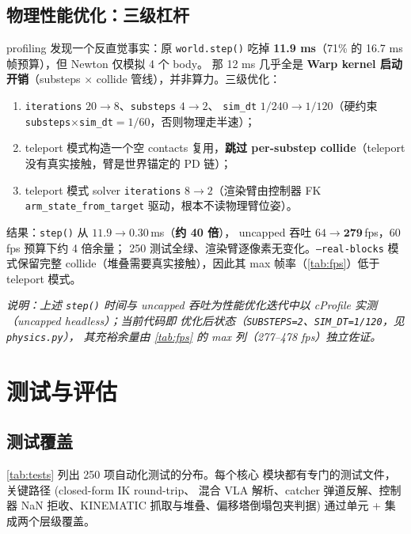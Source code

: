\documentclass[12pt, a4paper, UTF8]{ctexart}
\begin{document}
\subsection{物理性能优化：三级杠杆}\label{ssec:perf}
profiling 发现一个反直觉事实：原 \texttt{world.step()} 吃掉
\textbf{11.9 ms}（71\% 的 16.7 ms 帧预算），但 Newton 仅模拟 4 个 body。
那 12 ms 几乎全是 \textbf{Warp kernel 启动开销}（substeps $\times$
collide 管线），并非算力。三级优化：
\begin{enumerate}[leftmargin=*, itemsep=0pt]
  \item \texttt{iterations} $20\to8$、\texttt{substeps} $4\to2$、
    \texttt{sim\_dt} $1/240\to1/120$（硬约束
    \texttt{substeps}$\times$\texttt{sim\_dt}$=1/60$，否则物理走半速）；
  \item teleport 模式构造一个空 contacts 复用，\textbf{跳过 per-substep
    collide}（teleport 没有真实接触，臂是世界锚定的 PD 链）；
  \item teleport 模式 solver \texttt{iterations} $8\to2$（渲染臂由控制器
    FK \texttt{arm\_state\_from\_target} 驱动，根本不读物理臂位姿）。
\end{enumerate}
结果：\texttt{step()} 从 $11.9\to\mathbf{0.30}$\,ms（\textbf{约 40 倍}），
uncapped 吞吐 $64\to\mathbf{279}$\,fps，60 fps 预算下约 4 倍余量；
250 测试全绿、渲染臂逐像素无变化。\texttt{--real-blocks} 模式保留完整
collide（堆叠需要真实接触），因此其 max 帧率（\autoref{tab:fps}）低于
teleport 模式。

\noindent\footnotesize\textit{说明：上述 \texttt{step()} 时间与 uncapped
吞吐为性能优化迭代中以 cProfile 实测（uncapped headless）；当前代码即
优化后状态（\texttt{SUBSTEPS=2}、\texttt{SIM\_DT=1/120}，见 \texttt{physics.py}），
其充裕余量由 \autoref{tab:fps} 的 max 列（277--478 fps）独立佐证。}\normalsize

\section{测试与评估}\label{sec:eval}

\subsection{测试覆盖}
\autoref{tab:tests} 列出 250 项自动化测试的分布。每个核心
模块都有专门的测试文件，关键路径 (closed-form IK round-trip、
混合 VLA 解析、catcher 弹道反解、控制器 NaN 拒收、KINEMATIC
抓取与堆叠、偏移塔倒塌包夹判据) 通过单元 + 集成两个层级覆盖。
\end{document}
